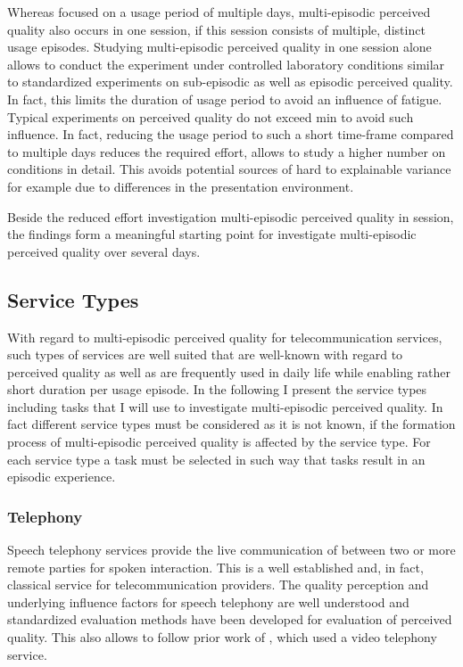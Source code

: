 Whereas \citet{moller_single-call_2011} focused on a usage period of multiple days, multi-episodic perceived quality also occurs in one session, if this session consists of multiple, distinct usage episodes.
Studying multi-episodic perceived quality in one session alone allows to conduct the experiment under controlled laboratory conditions similar to standardized experiments on sub-episodic as well as episodic perceived quality.
In fact, this limits the duration of usage period to avoid an influence of fatigue.
Typical experiments on perceived quality do not exceed \unit[90]{min} to avoid such influence.
In fact, reducing the usage period to such a short time-frame compared to multiple days reduces the required effort, allows to study a higher number on conditions in detail.
This avoids potential sources of hard to explainable variance for example due to differences in the presentation environment.

Beside the reduced effort investigation multi-episodic perceived quality in session, the findings form a meaningful starting point for investigate multi-episodic perceived quality over several days.

\subsection{Service Types}
With regard to multi-episodic perceived quality for telecommunication services, such types of services are well suited that are well-known with regard to perceived quality as well as are frequently used in daily life while enabling rather short duration per usage episode.
In the following I present the service types including tasks that I will use to investigate multi-episodic perceived quality.
In fact different service types must be considered as it is not known, if the formation process of multi-episodic perceived quality is affected by the service type.
For each service type a task must be selected in such way that tasks result in an episodic experience.

\subsubsection*{Telephony}\label{method:sct}
Speech telephony services provide the live communication of between two or more remote parties for spoken interaction.
This is a well established and, in fact, classical service for telecommunication providers.
The quality perception and underlying influence factors for speech telephony are well understood and standardized evaluation methods have been developed for evaluation of perceived quality.
This also allows to follow prior work of \citet{moller_single-call_2011}, which used a video telephony service.

